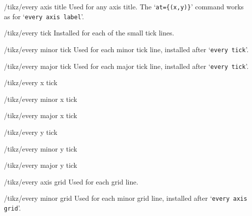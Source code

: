 \begin{stylekey}{/tikz/every axis title}
 Used for any axis title. The `\texttt{at=\{(x,y)\}}' command works as for `\texttt{every axis label}'.
\end{stylekey}

\begin{stylekey}{/tikz/every tick}
 Installed for each of the small tick lines.
\end{stylekey}

\begin{stylekey}{/tikz/every minor tick}
 Used for each minor tick line, installed after `\texttt{every tick}'.
\end{stylekey}

\begin{stylekey}{/tikz/every major tick}
 Used for each major tick line, installed after `\texttt{every tick}'.
\end{stylekey}

\begin{stylekey}{/tikz/every x tick}

\end{stylekey}

\begin{stylekey}{/tikz/every minor x tick}

\end{stylekey}

\begin{stylekey}{/tikz/every major x tick}

\end{stylekey}

\begin{stylekey}{/tikz/every y tick}

\end{stylekey}

\begin{stylekey}{/tikz/every minor y tick}

\end{stylekey}

\begin{stylekey}{/tikz/every major y tick}

\end{stylekey}

\begin{stylekey}{/tikz/every axis grid}
 Used for each grid line.
\end{stylekey}

\begin{stylekey}{/tikz/every minor grid}
 Used for each minor grid line, installed after `\texttt{every axis grid}'.
\end{stylekey}

